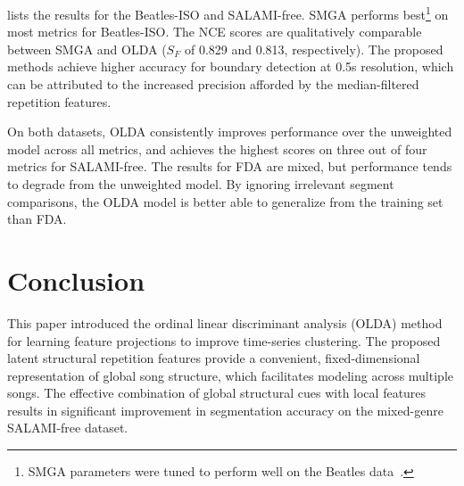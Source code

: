 \documentclass{article}
\begin{document}
 lists the results for the Beatles-ISO and SALAMI-free.
SMGA performs best\footnote{SMGA parameters were tuned to perform well on the Beatles data~\cite{serra2012unsupervised}.}
on most metrics for Beatles-ISO.\@
The NCE scores are qualitatively comparable between SMGA and OLDA ($S_F$ of 0.829 and 0.813, respectively).
The proposed methods achieve higher accuracy for boundary detection at 0.5s resolution, which can be attributed to the increased
precision afforded by the median-filtered repetition features.

On both datasets, OLDA consistently improves performance over the unweighted model across all metrics, and achieves the highest scores on three out of four metrics for SALAMI-free.
The results for FDA are mixed, but performance tends to degrade from the unweighted model.  By ignoring irrelevant segment comparisons, the OLDA model is better able to generalize from
the training set than FDA.\@

\section{Conclusion}
\label{sec:conclusion}
This paper introduced the ordinal linear discriminant analysis (OLDA) method for learning feature projections to improve time-series clustering.
The proposed latent structural repetition features provide a convenient, fixed-dimensional representation of global song structure, which 
facilitates modeling across multiple songs.
The effective combination of global structural cues with local features results in significant improvement in segmentation accuracy 
on the mixed-genre SALAMI-free dataset.



\end{document}
